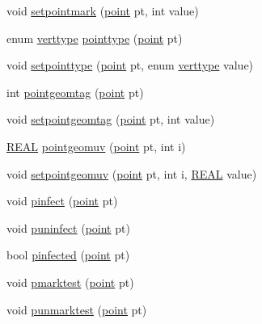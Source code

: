 \begin{DoxyCompactItemize}
\item 
void \hyperlink{classtetgenmesh_ad2cce627693ef75e8fc956b0e0743800}{setpointmark} (\hyperlink{classtetgenmesh_ace3fb4f80389185b7c9b18ab69a3dea2}{point} pt, int value)
\item 
enum \hyperlink{classtetgenmesh_ad0458f823a5eef2de89c7fae067aa2ac}{verttype} \hyperlink{classtetgenmesh_a87204594ee11bb38e68e0381e6e04b6c}{pointtype} (\hyperlink{classtetgenmesh_ace3fb4f80389185b7c9b18ab69a3dea2}{point} pt)
\item 
void \hyperlink{classtetgenmesh_a036752e66b8fcce81d7f983842fcf8d3}{setpointtype} (\hyperlink{classtetgenmesh_ace3fb4f80389185b7c9b18ab69a3dea2}{point} pt, enum \hyperlink{classtetgenmesh_ad0458f823a5eef2de89c7fae067aa2ac}{verttype} value)
\item 
int \hyperlink{classtetgenmesh_a5f3d4b9b05181247bc518d6c0b0ac790}{pointgeomtag} (\hyperlink{classtetgenmesh_ace3fb4f80389185b7c9b18ab69a3dea2}{point} pt)
\item 
void \hyperlink{classtetgenmesh_ae61f5def2617ad2cedf2bbc5f6a59c02}{setpointgeomtag} (\hyperlink{classtetgenmesh_ace3fb4f80389185b7c9b18ab69a3dea2}{point} pt, int value)
\item 
\hyperlink{tetgen_8h_a4b654506f18b8bfd61ad2a29a7e38c25}{R\+E\+AL} \hyperlink{classtetgenmesh_ad9b42ae25336d5ecb21577fe072a54a0}{pointgeomuv} (\hyperlink{classtetgenmesh_ace3fb4f80389185b7c9b18ab69a3dea2}{point} pt, int i)
\item 
void \hyperlink{classtetgenmesh_a9bf2266e82ad2f2faf77f6b502e8ba1d}{setpointgeomuv} (\hyperlink{classtetgenmesh_ace3fb4f80389185b7c9b18ab69a3dea2}{point} pt, int i, \hyperlink{tetgen_8h_a4b654506f18b8bfd61ad2a29a7e38c25}{R\+E\+AL} value)
\item 
void \hyperlink{classtetgenmesh_a3da09b1723336c0d9e82677f8f30c965}{pinfect} (\hyperlink{classtetgenmesh_ace3fb4f80389185b7c9b18ab69a3dea2}{point} pt)
\item 
void \hyperlink{classtetgenmesh_a6220e341248cd83ab6ee1c0d71e4d160}{puninfect} (\hyperlink{classtetgenmesh_ace3fb4f80389185b7c9b18ab69a3dea2}{point} pt)
\item 
bool \hyperlink{classtetgenmesh_acc0db186d69dcdf785b49d6e709fed7b}{pinfected} (\hyperlink{classtetgenmesh_ace3fb4f80389185b7c9b18ab69a3dea2}{point} pt)
\item 
void \hyperlink{classtetgenmesh_a7f5f5b3321dcc8cb4f7852fd63688043}{pmarktest} (\hyperlink{classtetgenmesh_ace3fb4f80389185b7c9b18ab69a3dea2}{point} pt)
\item 
void \hyperlink{classtetgenmesh_af01c7d8e906de52fb5e8622d5a8dfb15}{punmarktest} (\hyperlink{classtetgenmesh_ace3fb4f80389185b7c9b18ab69a3dea2}{point} pt)

\end{DoxyCompactItemize}
